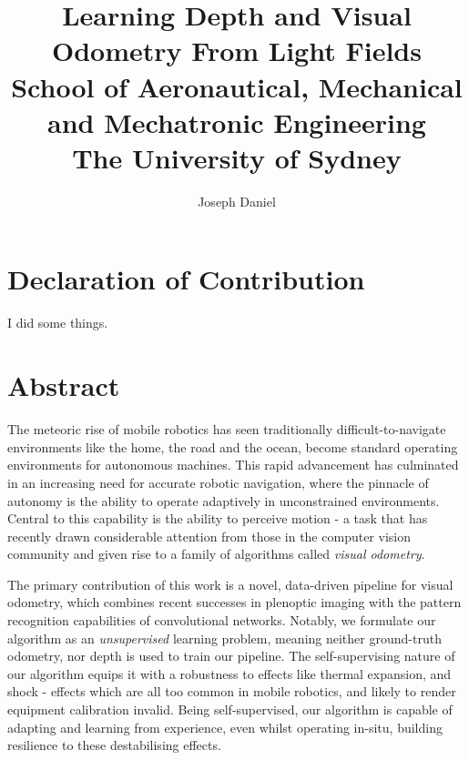 \documentclass[openany]{book}
\title{Learning Depth and Visual Odometry From Light Fields \\
\large School of Aeronautical, Mechanical and Mechatronic Engineering \\
\large The University of Sydney}
\author{Joseph Daniel}
\begin{document}
\frontmatter

\maketitle

\chapter*{Declaration of Contribution}
I did some things.

\chapter*{Abstract}

The meteoric rise of mobile robotics has seen traditionally difficult-to-navigate environments like the home, the road and the ocean, become standard operating environments for autonomous machines. This rapid advancement has culminated in an increasing need for accurate robotic navigation, where the pinnacle of autonomy is the ability to operate adaptively in unconstrained environments. Central to this capability is the ability to perceive motion - a task that has recently drawn considerable attention from those in the computer vision community and given rise to a family of algorithms called \textit{visual odometry}. 

The primary contribution of this work is a novel, data-driven pipeline for visual odometry, which combines recent successes in plenoptic imaging with the pattern recognition capabilities of convolutional networks. Notably, we formulate our algorithm as an \textit{unsupervised} learning problem, meaning neither ground-truth odometry, nor depth is used to train our pipeline. The self-supervising nature of our algorithm equips it with a robustness to effects like thermal expansion, and shock - effects which are all too common in mobile robotics, and likely to render equipment calibration invalid. Being self-supervised, our algorithm is capable of adapting and learning from experience, even whilst operating in-situ, building resilience to these destabilising effects.

\end{document}
